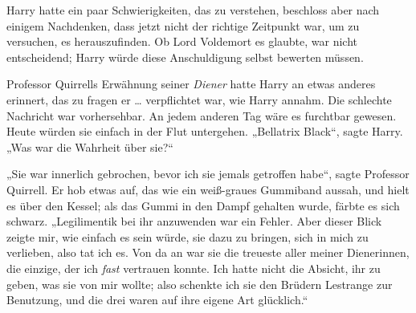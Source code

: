 Harry hatte ein paar Schwierigkeiten, das zu verstehen, beschloss aber nach einigem Nachdenken, dass jetzt nicht der richtige Zeitpunkt war, um zu versuchen, es herauszufinden. Ob Lord Voldemort es glaubte, war nicht entscheidend; Harry würde diese Anschuldigung selbst bewerten müssen.

Professor Quirrells Erwähnung seiner \emph{Diener} hatte Harry an etwas anderes erinnert, das zu fragen er … verpflichtet war, wie Harry annahm. Die schlechte Nachricht war vorhersehbar. An jedem anderen Tag wäre es furchtbar gewesen. Heute würden sie einfach in der Flut untergehen.
„Bellatrix Black“, sagte Harry.
„Was war die Wahrheit über sie?“

„Sie war innerlich gebrochen, bevor ich sie jemals getroffen habe“, sagte Professor Quirrell. Er hob etwas auf, das wie ein weiß-graues Gummiband aussah, und hielt es über den Kessel; als das Gummi in den Dampf gehalten wurde, färbte es sich schwarz.
„Legilimentik bei ihr anzuwenden war ein Fehler. Aber dieser Blick zeigte mir, wie einfach es sein würde, sie dazu zu bringen, sich in mich zu verlieben, also tat ich es. Von da an war sie die treueste aller meiner Dienerinnen, die einzige, der ich \emph{fast} vertrauen konnte. Ich hatte nicht die Absicht, ihr zu geben, was sie von mir wollte; also schenkte ich sie den Brüdern Lestrange zur Benutzung, und die drei waren auf ihre eigene Art glücklich.“

